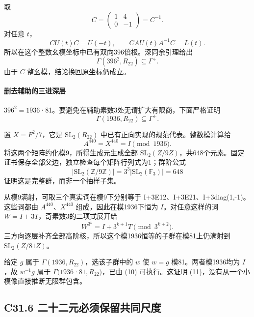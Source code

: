 \documentclass[11pt,a4paper]{article}
\theoremstyle{definition}
\numberwithin{equation}{section}
\begin{document}
{取} \[
C=\begin{pmatrix}1&4\\0&-1\end{pmatrix}=C^{-1}.
\] {对任意} {\ensuremath{t}，} \[
CU(t)C=U(-t),\qquad
CAU(t)A^{-1}C=L(t).
\] {所以在这个整数幺模坐标中已有双向396倍根。深同余引理给出} \[
\Gamma(396^2,R_{22})\subseteq\Gamma^+.
\tag{C31.10}
\] {由于} {\ensuremath{C}} {整幺模，结论换回原坐标仍成立。}

\paragraph*{\texorpdfstring{{删去辅助的三进深层}}{删去辅助的三进深层}}\label{C31-h205}

{\ensuremath{396^{2}=1936}·81。要避免在辅助素数3处无谓扩大有限商，下面严格证明} \[
\boxed{\Gamma(1936,R_{22})\subseteq\Gamma^+.}
\tag{C31.11}
\]

{置} {\ensuremath{X=F^{2}/7}，它是} {\ensuremath{\mathrm{SL}_{2}(R_{22})}} {中已有正向实现的规范代表。整数模计算给} \[
A^{440}=X^{440}=I\pmod {1936}.
\] {将这两个矩阵约化模9，所得生成元生成全部} {\ensuremath{\mathrm{SL}_{2}(Z/9Z)}，共648个元素。固定证书保存全部父边，独立检查每个矩阵行列式为1；群阶公式} \[
|\mathrm{SL}_2(\mathbb Z/9\mathbb Z)|=3^3|\mathrm{SL}_2(\mathbb F_3)|=648
\] {证明这是完整群，而非一个抽样子集。}

{从模9满射，可取三个真实词在模9下分别等于} {I+3E12、I+3E21、I+3diag(1,-1)。这些词都由} {\ensuremath{A^{440}}、\ensuremath{X^{440}}} {组成，因此在模1936下恒为} {\ensuremath{I}。对任意这样的词} {\ensuremath{W=I+3T}，奇素数3的二项式展开给} \[
W^{3^k}=I+3^{k+1}T\pmod {3^{k+2}}.
\] {三方向逐层补齐全部高阶核，所以这个模1936恒等的子群在模81上仍满射到} {\ensuremath{\mathrm{SL}_{2}(Z/81Z)}。}

{给定} {\ensuremath{g}} {属于} {\ensuremath{\Gamma (1936,R_{22})}，选该子群中的} {\ensuremath{w}} {使} {\ensuremath{w=g}} {模81。两者模1936均为} {\ensuremath{I}，故} {\ensuremath{w^{-1}g}} {属于} {\ensuremath{\Gamma (1936}·\ensuremath{81,R_{22})}，已由} {(10)} {可执行。这证明} {(11)，没有从一个小模像直接推断无限群包含。}

\subsection*{\texorpdfstring{{C31.6} {二十二元必须保留共同尺度}}{C31.6 二十二元必须保留共同尺度}}\label{C31-h206}
\end{document}
